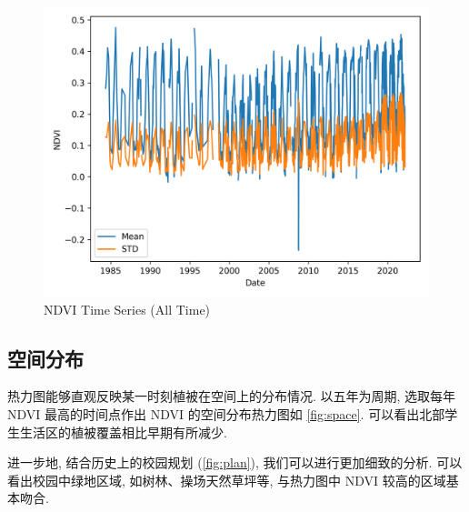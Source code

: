 \begin{figure}[htbp]
  \centering
  \includegraphics[width=140mm]{assets/NDVI.png}
  \caption{NDVI Time Series (All Time)}
  \label{fig:NDVI}
\end{figure}

\subsection{空间分布}

热力图能够直观反映某一时刻植被在空间上的分布情况.
以五年为周期, 选取每年 NDVI 最高的时间点作出 NDVI 的空间分布热力图如 \cref{fig:space}.
可以看出北部学生生活区的植被覆盖相比早期有所减少.

进一步地, 结合历史上的校园规划 (\cref{fig:plan}), 我们可以进行更加细致的分析.
可以看出校园中绿地区域, 如树林、操场天然草坪等, 与热力图中 NDVI 较高的区域基本吻合.

